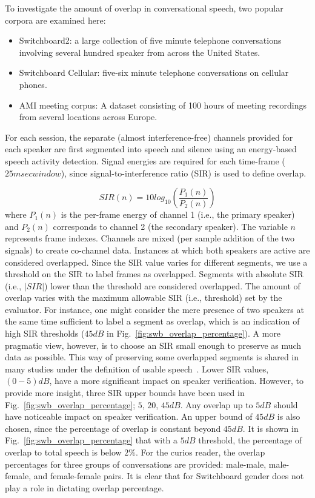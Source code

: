 To investigate the amount of overlap in conversational speech, two popular corpora are examined here: 
\begin{itemize}
	\item Switchboard2: a large collection of five minute telephone conversations involving several hundred speaker from across the United States.
	\item Switchboard Cellular: five-six minute telephone conversations on cellular phones.
	\item AMI meeting corpus: A dataset consisting of 100 hours of meeting recordings from several locations across Europe. 
\end{itemize}
For each session, the separate (almost interference-free) channels provided for each speaker are first segmented into speech and silence using an energy-based speech activity detection. 
Signal energies are required for each time-frame ($25msec window$), since signal-to-interference ratio (SIR) is used to define overlap. 

\begin{equation}
\label{eq:abs_sir}
SIR(n) = 10log_{10}(\frac{P_1(n)}{P_2(n)})
\end{equation}
where $P_1(n)$ is the per-frame energy of channel 1 (i.e., the primary speaker) and $P_2(n)$ corresponds to channel 2 (the secondary speaker). 
The variable $n$ represents frame indexes. 
Channels are mixed (per sample addition of the two signals) to create co-channel data. 
Instances at which both speakers are active are considered overlapped. 
Since the SIR value varies for different segments, we use a threshold on the SIR to label frames as overlapped. 
Segments with absolute SIR (i.e., $|SIR|$) lower than the threshold are considered overlapped.
The amount of overlap varies with the maximum allowable SIR (i.e., threshold) set by the evaluator. 
For instance, one might consider the mere presence of two speakers at the same time sufficient to label a segment as overlap, which is an indication of high SIR thresholds ($45dB$ in Fig.~\ref{fig:swb_overlap_percentage}). 
A more pragmatic view, however, is to choose an SIR small enough to preserve as much data as possible. 
This way of preserving some overlapped segments is shared in many studies under the definition of usable speech~\cite{yantorno_report,smolenski_tut}. 
Lower SIR values, $(0-5) dB$, have a more significant impact on speaker verification.
However, to provide more insight, three SIR upper bounds have been used in Fig.~\ref{fig:swb_overlap_percentage}; $5$, $20$, $45dB$. 
Any overlap up to $5dB$ should have noticeable impact on speaker verification. 
An upper bound of $45dB$ is also chosen, since the percentage of overlap is constant beyond $45dB$. 
It is shown in Fig.~\ref{fig:swb_overlap_percentage} that with a $5dB$ threshold, the percentage of overlap to total speech is below $2\%$. 
For the curios reader, the overlap percentages for three groups of conversations are provided: male-male, male-female, and female-female pairs. 
It is clear that for Switchboard gender does not play a role in dictating overlap percentage. 

